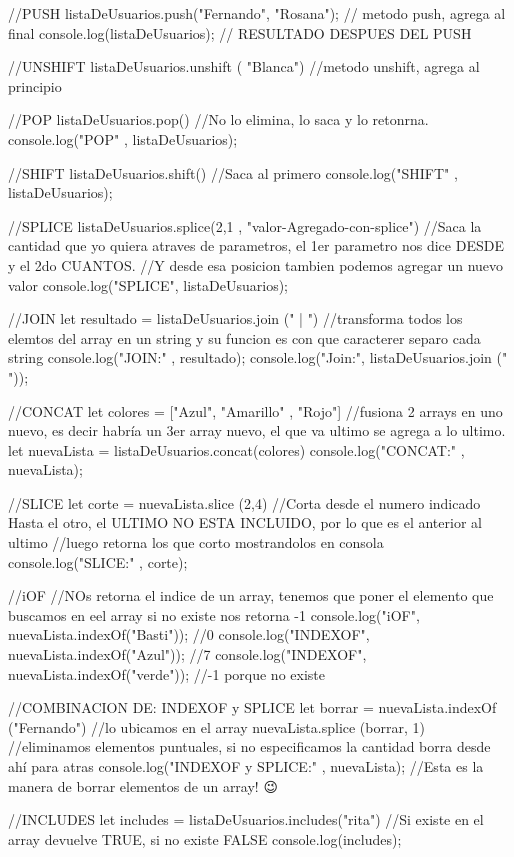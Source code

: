 
//PUSH
listaDeUsuarios.push("Fernando", "Rosana"); // metodo push, agrega al final
console.log(listaDeUsuarios); // RESULTADO DESPUES DEL PUSH

//UNSHIFT
listaDeUsuarios.unshift ( "Blanca") //metodo unshift, agrega al principio

//POP
listaDeUsuarios.pop() //No lo elimina, lo saca y lo retonrna.
console.log("POP" , listaDeUsuarios);

//SHIFT
listaDeUsuarios.shift() //Saca al primero
console.log("SHIFT" , listaDeUsuarios);

//SPLICE
listaDeUsuarios.splice(2,1 , "valor-Agregado-con-splice") //Saca la cantidad que yo quiera atraves de parametros, el 1er parametro nos dice DESDE y el 2do CUANTOS.
//Y desde esa posicion tambien podemos agregar un nuevo valor
console.log("SPLICE", listaDeUsuarios);

//JOIN
let resultado = listaDeUsuarios.join (" | ") //transforma todos los elemtos del array en un string y su funcion es con que caracterer separo cada string
console.log("JOIN:" , resultado);
console.log("Join:", listaDeUsuarios.join (" \*\*\* "));

//CONCAT
let colores = ["Azul", "Amarillo" , "Rojo"] //fusiona 2 arrays en uno nuevo, es decir habría un 3er array nuevo, el que va ultimo se agrega a lo ultimo.
let nuevaLista = listaDeUsuarios.concat(colores)
console.log("CONCAT:" , nuevaLista);

//SLICE
let corte = nuevaLista.slice (2,4) //Corta desde el numero indicado Hasta el otro, el ULTIMO NO ESTA INCLUIDO, por lo que es el anterior al ultimo
//luego retorna los que corto mostrandolos en consola
console.log("SLICE:" , corte);

//iOF
//NOs retorna el indice de un array, tenemos que poner el elemento que buscamos en eel array si no existe nos retorna -1
console.log("iOF", nuevaLista.indexOf("Basti")); //0
console.log("INDEXOF", nuevaLista.indexOf("Azul")); //7
console.log("INDEXOF", nuevaLista.indexOf("verde")); //-1 porque no existe

//COMBINACION DE: INDEXOF y SPLICE
let borrar = nuevaLista.indexOf ("Fernando") //lo ubicamos en el array
nuevaLista.splice (borrar, 1) //eliminamos elementos puntuales, si no especificamos la cantidad borra desde ahí para atras
console.log("INDEXOF y SPLICE:" , nuevaLista); //Esta es la manera de borrar elementos de un array! 😉

//INCLUDES
let includes = listaDeUsuarios.includes("rita") //Si existe en el array devuelve TRUE, si no existe FALSE
console.log(includes);

